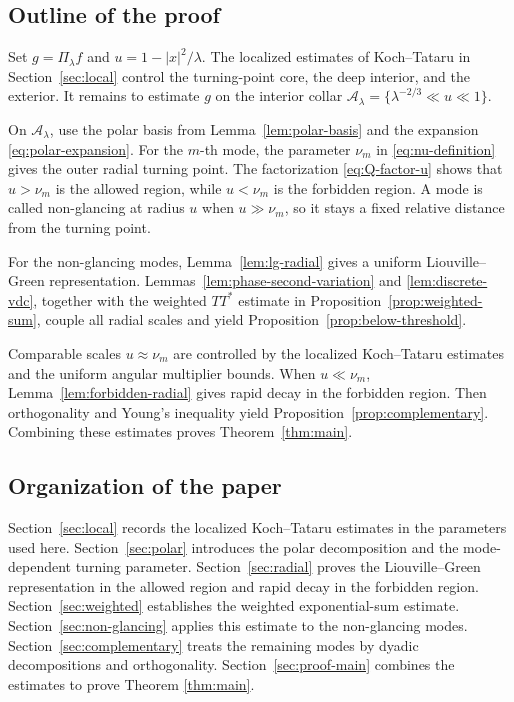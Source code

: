 \documentclass[11pt,a4paper]{amsart}
\numberwithin{equation}{section}
\begin{document}
\subsection{Outline of the proof}
Set \(g=\Pi_\lambda f\) and \(u=1-|x|^2/\lambda\).  The localized estimates of Koch--Tataru in
Section~\ref{sec:local} control the turning-point core, the deep interior,
and the exterior.  It remains to estimate \(g\) on the interior collar
\(\mathcal A_\lambda=\{\lambda^{-2/3}\ll u\ll1\}\). 

On \(\mathcal A_\lambda\), use the polar basis from
Lemma~\ref{lem:polar-basis} and the expansion \eqref{eq:polar-expansion}.
For the \(m\)-th mode, the parameter \(\nu_m\)
in \eqref{eq:nu-definition} gives the outer radial turning point.  The
factorization \eqref{eq:Q-factor-u} shows that \(u>\nu_m\) is the
allowed region, while \(u<\nu_m\) is the
forbidden region.  A mode is called
non-glancing at radius \(u\) when \( u\gg \nu_m\), so it stays a
fixed relative distance from the turning point.

For the non-glancing modes, Lemma~\ref{lem:lg-radial} gives a uniform
Liouville--Green representation.  Lemmas~\ref{lem:phase-second-variation}
and \ref{lem:discrete-vdc}, together with the weighted \(TT^*\) estimate in
Proposition~\ref{prop:weighted-sum}, couple all radial scales and yield
Proposition~\ref{prop:below-threshold}.

Comparable scales $u\approx \nu_m$ are controlled by the localized
Koch--Tataru estimates and the uniform angular multiplier bounds.  When
\(u\ll \nu_m\), Lemma~\ref{lem:forbidden-radial} gives rapid decay in the
forbidden region.  Then orthogonality and  Young's inequality yield
Proposition~\ref{prop:complementary}.  Combining these estimates proves
Theorem~\ref{thm:main}.  

\subsection{Organization of the paper}
 Section~\ref{sec:local} records the localized
Koch--Tataru estimates in the parameters used here.
Section~\ref{sec:polar} introduces the polar decomposition and the
mode-dependent turning parameter. Section~\ref{sec:radial} proves the
Liouville--Green representation in the allowed region and rapid decay in the
forbidden region. Section~\ref{sec:weighted} establishes the weighted 
exponential-sum estimate. Section~\ref{sec:non-glancing} applies this estimate
to the non-glancing modes. Section~\ref{sec:complementary} treats the remaining
modes by dyadic decompositions and orthogonality. Section~\ref{sec:proof-main}
combines the estimates to prove Theorem \ref{thm:main}.
\end{document}
